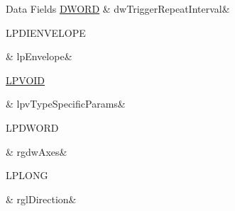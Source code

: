 \begin{DoxyFields}{Data Fields}
\hypertarget{a00003_aa07fcd7eccd253435edb652aba5d870b}{\hyperlink{a00003_a50e15ae51c87ae06ab29c8148cb5f36c}{D\-W\-O\-R\-D}}\label{a00003_aa07fcd7eccd253435edb652aba5d870b}
&
dw\-Trigger\-Repeat\-Interval&
\\
\hline

\hypertarget{a00003_aeaa5ded44711a1ab7389a50398409257}{L\-P\-D\-I\-E\-N\-V\-E\-L\-O\-P\-E}\label{a00003_aeaa5ded44711a1ab7389a50398409257}
&
lp\-Envelope&
\\
\hline

\hypertarget{a00003_a572a543576acf167d723bb3142294829}{\hyperlink{a00003_ae611cd6871649dbfe37273a0253d5e61}{L\-P\-V\-O\-I\-D}}\label{a00003_a572a543576acf167d723bb3142294829}
&
lpv\-Type\-Specific\-Params&
\\
\hline

\hypertarget{a00003_aedfe5b9ab695e3587226f7f17e96f133}{L\-P\-D\-W\-O\-R\-D}\label{a00003_aedfe5b9ab695e3587226f7f17e96f133}
&
rgdw\-Axes&
\\
\hline

\hypertarget{a00003_a200e86194693b7b818ccc0f892292e31}{L\-P\-L\-O\-N\-G}\label{a00003_a200e86194693b7b818ccc0f892292e31}
&
rgl\-Direction&
\\
\hline

\end{DoxyFields}
\label{d2/d1f/a00083}
\hypertarget{a00003_d2/d1f/a00083}{}
